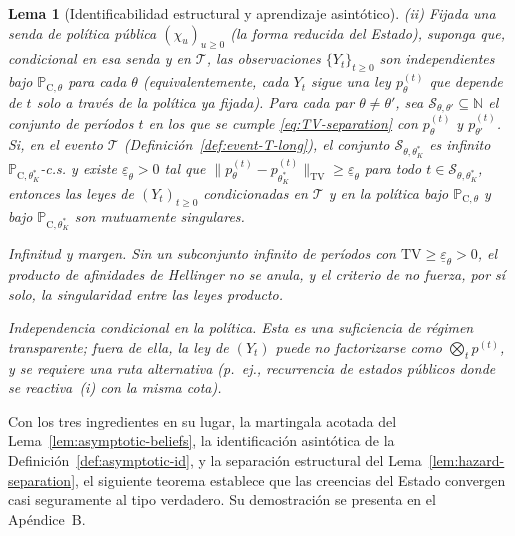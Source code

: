 \documentclass[pdflatex,sn-mathphys-ay]{sn-jnl}
\theoremstyle{thmstyleone}
\newtheorem{lemma}[theorem]{Lema}
\theoremstyle{thmstyletwo}
\theoremstyle{thmstylethree}
\newcommand{\ProbC}[1]{\mathbb{P}_{\mathrm{C},#1}}
\newcommand{\1}{\mathbf{1}}
\begin{document}
\begin{lemma}[Identificabilidad estructural y aprendizaje asintótico]
\medskip
\noindent\textup{(ii)}
Fijada una senda de política pública $(\chi_u)_{u\ge 0}$ \textup{(}la forma reducida del Estado\textup{)}, suponga que, condicional en esa senda y en $\mathcal{T}$, las observaciones $\{Y_t\}_{t\ge 0}$ son independientes bajo $\ProbC{\theta}$ para cada $\theta$ \textup{(}equivalentemente, cada $Y_t$ sigue una ley $p_\theta^{(t)}$ que depende de $t$ solo a través de la política ya fijada\textup{)}. Para cada par $\theta\neq\theta'$, sea $\mathcal{S}_{\theta,\theta'}\subseteq\mathbb{N}$ el conjunto de períodos $t$ en los que se cumple \eqref{eq:TV-separation} con $p_\theta^{(t)}$ y $p_{\theta'}^{(t)}$. Si, en el evento $\mathcal{T}$ \textup{(}Definición~\ref{def:event-T-long}\textup{)}, el conjunto $\mathcal{S}_{\theta,\theta_K^\ast}$ es infinito $\ProbC{\theta_K^\ast}$-c.s. y existe $\underline{\varepsilon}_{\theta}>0$ tal que $\|p_\theta^{(t)}-p_{\theta_K^\ast}^{(t)}\|_{\mathrm{TV}}\ge \underline{\varepsilon}_{\theta}$ para todo $t\in\mathcal{S}_{\theta,\theta_K^\ast}$, entonces las leyes de $(Y_t)_{t\ge 0}$ condicionadas en $\mathcal{T}$ y en la política bajo $\ProbC{\theta}$ y bajo $\ProbC{\theta_K^\ast}$ son mutuamente singulares.

\medskip
\begin{list}{}{%
  \setlength{\leftmargin}{2.25em}%
  \setlength{\labelwidth}{2.25em}%
  \setlength{\labelsep}{0.45em}%
  \setlength{\itemsep}{0.35em}%
  \setlength{\parsep}{0pt}%
  \setlength{\topsep}{0.25em}%
}
\item[\textup{(C3)}] \textup{Infinitud y margen.}\quad
Sin un subconjunto infinito de períodos con $\mathrm{TV}\ge\underline{\varepsilon}_\theta>0$, el producto de afinidades de Hellinger no se anula, y el criterio de \citet{Kakutani1948} no fuerza, por sí solo, la singularidad entre las leyes producto.
\item[\textup{(C4)}] \textup{Independencia condicional en la política.}\quad
Esta es una suficiencia de régimen transparente; fuera de ella, la ley de $(Y_t)$ puede no factorizarse como $\bigotimes_t p^{(t)}$, y se requiere una ruta alternativa \textup{(}p.\ ej., recurrencia de estados públicos donde se reactiva~\textup{(i)} con la misma cota\textup{)}.
\end{list}
\end{lemma}

Con los tres ingredientes en su lugar, la martingala acotada del Lema~\ref{lem:asymptotic-beliefs}, la identificación asintótica de la Definición~\ref{def:asymptotic-id}, y la separación estructural del Lema~\ref{lem:hazard-separation}, el siguiente teorema establece que las creencias del Estado convergen casi seguramente al tipo verdadero. Su demostración se presenta en el Apéndice~B.
\end{document}
